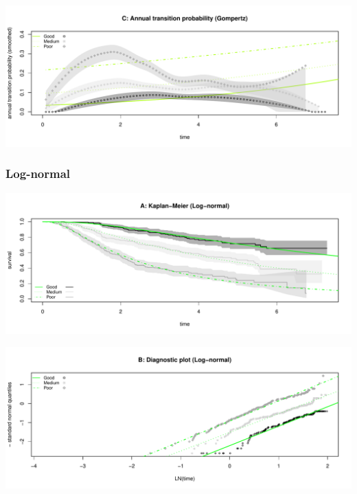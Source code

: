 \documentclass[
]{article}
\begin{document}
\begin{flushleft}\includegraphics[height=0.25\textheight]{BC_OS_output/Images/Figure_param_models-9} \end{flushleft}

\clearpage

\subsubsection{Log-normal}\label{log-normal}

\begin{flushleft}\includegraphics[height=0.25\textheight]{BC_OS_output/Images/Figure_param_models-10} \end{flushleft}

\begin{flushleft}\includegraphics[height=0.25\textheight]{BC_OS_output/Images/Figure_param_models-11} \end{flushleft}
\end{document}

